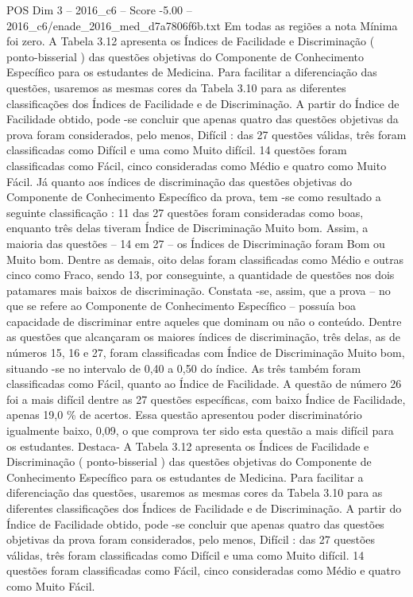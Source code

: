 \begin{textsample}{POS Dim 3 – 2016\_c6 – Score -5.00 – 2016\_c6/enade\_2016\_med\_d7a7806f6b.txt}
Em todas as regiões a nota Mínima foi zero.
A Tabela 3.12 apresenta os Índices de Facilidade e Discriminação ( ponto-bisserial ) das questões objetivas do Componente de Conhecimento Específico para os estudantes de Medicina.
Para facilitar a diferenciação das questões, usaremos as mesmas cores da Tabela 3.10 para as diferentes classificações dos Índices de Facilidade e de Discriminação.
A partir do Índice de Facilidade obtido, pode -se concluir que apenas quatro das questões objetivas da prova foram considerados, pelo menos, Difícil : das 27 questões válidas, três foram classificadas como Difícil e uma como Muito difícil. 14 questões foram classificadas como Fácil, cinco consideradas como Médio e quatro como Muito Fácil.
Já quanto aos índices de discriminação das questões objetivas do Componente de Conhecimento Específico da prova, tem -se como resultado a seguinte classificação : 11 das 27 questões foram consideradas como boas, enquanto três delas tiveram Índice de Discriminação Muito bom.
Assim, a maioria das questões – 14 em 27 – os Índices de Discriminação foram Bom ou Muito bom.
Dentre as demais, oito delas foram classificadas como Médio e outras cinco como Fraco, sendo 13, por conseguinte, a quantidade de questões nos dois patamares mais baixos de discriminação.
Constata -se, assim, que a prova – no que se refere ao Componente de Conhecimento Específico – possuía boa capacidade de discriminar entre aqueles que dominam ou não o conteúdo.
Dentre as questões que alcançaram os maiores índices de discriminação, três delas, as de números 15, 16 e 27, foram classificadas com Índice de Discriminação Muito bom, situando -se no intervalo de 0,40 a 0,50 do índice.
As três também foram classificadas como Fácil, quanto ao Índice de Facilidade.
A questão de número 26 foi a mais difícil dentre as 27 questões específicas, com baixo Índice de Facilidade, apenas 19,0 \% de acertos.
Essa questão apresentou poder discriminatório igualmente baixo, 0,09, o que comprova ter sido esta questão a mais difícil para os estudantes.
Destaca- A Tabela 3.12 apresenta os Índices de Facilidade e Discriminação ( ponto-bisserial ) das questões objetivas do Componente de Conhecimento Específico para os estudantes de Medicina.
Para facilitar a diferenciação das questões, usaremos as mesmas cores da Tabela 3.10 para as diferentes classificações dos Índices de Facilidade e de Discriminação.
A partir do Índice de Facilidade obtido, pode -se concluir que apenas quatro das questões objetivas da prova foram considerados, pelo menos, Difícil : das 27 questões válidas, três foram classificadas como Difícil e uma como Muito difícil. 14 questões foram classificadas como Fácil, cinco consideradas como Médio e quatro como Muito Fácil.

\end{textsample}
